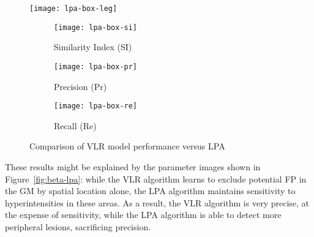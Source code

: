 \begin{figure}
  \centering
  \texttt{[image: lpa-box-leg]}\\
  \begin{subfigure}{0.32\textwidth}
    \centering
    \texttt{[image: lpa-box-si]}
    \caption{Similarity Index (SI)}%
    \label{fig:seg-lpa-si}
  \end{subfigure}
  \begin{subfigure}{0.32\textwidth}
    \centering
    \texttt{[image: lpa-box-pr]}
    \caption{Precision (Pr)}%
    \label{fig:seg-lpa-pr}
  \end{subfigure}
  \begin{subfigure}{0.32\textwidth}
    \centering
    \texttt{[image: lpa-box-re]}
    \caption{Recall (Re)}%
    \label{fig:seg-lpa-re}
  \end{subfigure}
  \caption{Comparison of VLR model performance versus LPA}%
  \label{fig:seg-lpa}
\end{figure}
These results might be explained by the parameter images shown in Figure~\ref{fig:beta-lpa}:
while the VLR algorithm learns to exclude potential FP in the GM by spatial location alone,
the LPA algorithm maintains sensitivity to hyperintensities in these areas.
As a result, the VLR algorithm is very precise, at the expense of sensitivity,
while the LPA algorithm is able to detect more peripheral lesions, sacrificing precision.
